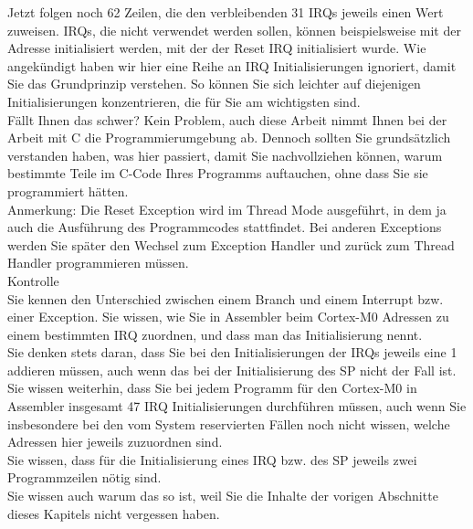 Jetzt folgen noch 62 Zeilen, die den verbleibenden 31 IRQs jeweils einen Wert zuweisen. IRQs, die nicht verwendet werden sollen, können beispielsweise mit der Adresse initialisiert werden, mit der der Reset IRQ initialisiert wurde. Wie angekündigt haben wir hier eine Reihe an IRQ Initialisierungen ignoriert, damit Sie das Grundprinzip verstehen. So können Sie sich leichter auf diejenigen Initialisierungen konzentrieren, die für Sie am wichtigsten sind.\\

Fällt Ihnen das schwer? Kein Problem, auch diese Arbeit nimmt Ihnen bei der Arbeit mit C die Programmierumgebung ab. Dennoch sollten Sie grundsätzlich verstanden haben, was hier passiert, damit Sie nachvollziehen können, warum bestimmte Teile im C-Code Ihres Programms auftauchen, ohne dass Sie sie programmiert hätten.\\

Anmerkung: Die Reset Exception wird im Thread Mode ausgeführt, in dem ja auch die Ausführung des Programmcodes stattfindet. Bei anderen Exceptions werden Sie später den Wechsel zum Exception Handler und zurück zum Thread Handler programmieren müssen.\\

Kontrolle\\

Sie kennen den Unterschied zwischen einem Branch und einem Interrupt bzw. einer Exception. Sie wissen, wie Sie in Assembler beim Cortex-M0 Adressen zu einem bestimmten IRQ zuordnen, und dass man das Initialisierung nennt. \\

Sie denken stets daran, dass Sie bei den Initialisierungen der IRQs jeweils eine 1 addieren müssen, auch wenn das bei der Initialisierung des SP nicht der Fall ist. \\

Sie wissen weiterhin, dass Sie bei jedem Programm für den Cortex-M0 in Assembler insgesamt 47 IRQ Initialisierungen durchführen müssen, auch wenn Sie insbesondere bei den vom System reservierten Fällen noch nicht wissen, welche Adressen hier jeweils zuzuordnen sind. \\

Sie wissen, dass für die Initialisierung eines IRQ bzw. des SP jeweils zwei Programmzeilen nötig sind. \\

Sie wissen auch warum das so ist, weil Sie die Inhalte der vorigen Abschnitte dieses Kapitels nicht vergessen haben.\\

